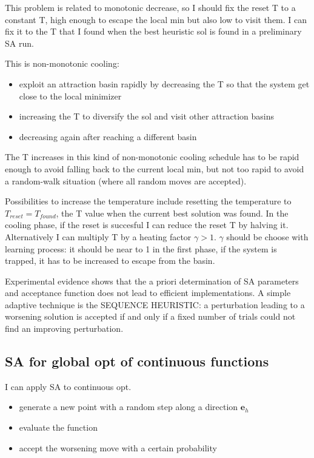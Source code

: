\documentclass[10pt]{article}
\begin{document}
This problem is related to monotonic decrease, so I should fix the reset T to a constant T, high enough to escape the local min but also low to visit them. I can fix it to the T that I found when the best heuristic sol is found in a preliminary SA run. 

This is non-monotonic cooling:

\begin{itemize}
\item exploit an attraction basin rapidly
by decreasing the T so that the system get close to the local minimizer
\item increasing the
T to diversify the sol and visit other attraction basins
\item decreasing again after reaching a different
basin
\end{itemize}

The T increases in this kind of non-monotonic cooling schedule has to be rapid enough to avoid falling back to the current local min, but not too rapid to avoid a random-walk situation (where all random moves are accepted).

Possibilities to increase the temperature include resetting the temperature to $ T_{reset} = T_{found} $, the T value when the current best solution was found. 
In the cooling phase, if the reset is succesful I can reduce the reset T by halving it.
Alternatively I can multiply T by a heating factor $ \gamma > 1 $. $ \gamma $ should be choose with learning process: it should be near to 1 in the first phase, if the system is trapped, it has to be increased to escape from the basin.

Experimental evidence shows that the a priori determination of SA parameters and acceptance function does not
lead to efficient implementations. A simple adaptive technique is the SEQUENCE HEURISTIC: a perturbation leading to a worsening solution is accepted if and only if a fixed number of trials could not find an improving perturbation.

\subsection{SA for global opt of continuous functions}
I can apply SA to continuous opt. 

\begin{itemize}
\item generate a new point with a random step along a direction $ \textbf{e}_h $
\item evaluate the function
\item accept the worsening move with a certain probability
\end{itemize}
\end{document}
